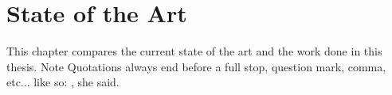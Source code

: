 \chapter{State of the Art}
\label{Chapter::State_of_the_Art} %

This chapter compares the current state of the art and the work done in this thesis.
Note Quotations always end before a full stop, question mark, comma, etc... like so: , she said.

